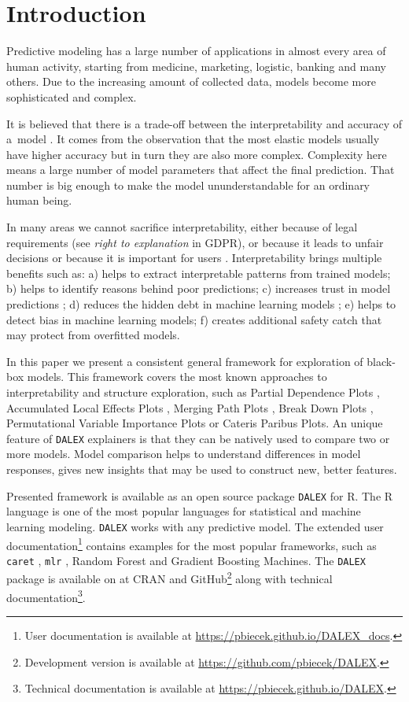 \documentclass[twoside,11pt]{article}
\begin{document}
\section{Introduction}

Predictive modeling has a large number of applications in almost every area of human activity, starting from medicine, marketing, logistic, banking and many others. Due to the increasing amount of collected data, models become more sophisticated and complex. 

It is believed that there is a trade-off between the interpretability and accuracy of a~model \citep[see][]{tradeoff_interpretability_accuracy}. It comes from the observation that the most elastic models usually have higher accuracy but in turn they are also more complex. Complexity here means a large number of model parameters that affect the final prediction. That number is big enough to make the model ununderstandable for an ordinary human being.

In many areas we cannot sacrifice interpretability, either because of legal requirements (see  \textit{right to explanation} in GDPR), or because it leads to unfair decisions \citep[see][]{ONeil} or because it is important for users \citep[see][]{shapley}. Interpretability brings multiple benefits such as:
 a) helps to extract interpretable patterns from trained models; b) helps to identify reasons behind poor predictions; c) increases trust in model predictions \citep[see][]{lime}; d) reduces the hidden debt in machine learning models \citep[see][]{Dennison_2015}; e) helps to detect bias in machine learning models; f) creates additional safety catch that may protect from overfitted models. 
 
In this paper we present a consistent general framework for exploration of black-box models. This framework covers the most known approaches to interpretability and structure exploration, such as Partial Dependence Plots \citep{pdp}, Accumulated Local Effects Plots \citep{ALEPlot}, Merging Path Plots \citep{factorMerger}, Break Down Plots \citep{breakDownlive}, Permutational Variable Importance Plots \citep{Fisher2018} or Cateris Paribus Plots. An unique feature of \texttt{DALEX} explainers is that they can be natively used to compare two or more models. Model comparison helps to understand differences in model responses, gives new insights that may be used to construct new, better features. 

Presented framework is available as an open source package \texttt{DALEX} for R. The R language \citep{Rcran} is one of the most popular languages for statistical and machine learning modeling. \texttt{DALEX} works with any predictive model. The extended user documentation\footnote{User documentation is available at \url{https://pbiecek.github.io/DALEX\_docs}.} contains examples for the most popular frameworks, such as \texttt{caret} \citep{caret}, \texttt{mlr} \citep{mlr}, Random Forest and Gradient Boosting Machines. 
The \texttt{DALEX} package is available on at CRAN and GitHub\footnote{Development version is available at \url{https://github.com/pbiecek/DALEX}.} along with technical documentation\footnote{Technical documentation is available at \url{https://pbiecek.github.io/DALEX}.}.
\end{document}
